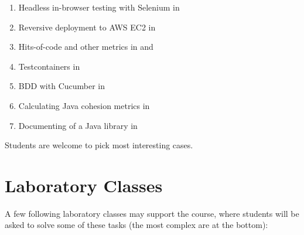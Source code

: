 \documentclass[nobrand,anonymous,nodate,nosecurity]{huawei}
\begin{document}
{\begin{enumerate}
  \item Headless in-browser testing with Selenium in 
  \item Reversive deployment to AWS EC2 in 
  \item Hits-of-code and other metrics in  and 
  \item Testcontainers in 
  \item BDD with Cucumber in 
  \item Calculating Java cohesion metrics in 
  \item Documenting  of a Java library in 
\end{enumerate}

Students are welcome to pick most interesting cases.

\newpage
\section*{Laboratory Classes}

A few following laboratory classes may support the course, where students
will be asked to solve some of these tasks (the most complex are at the bottom):

}
\end{document}

